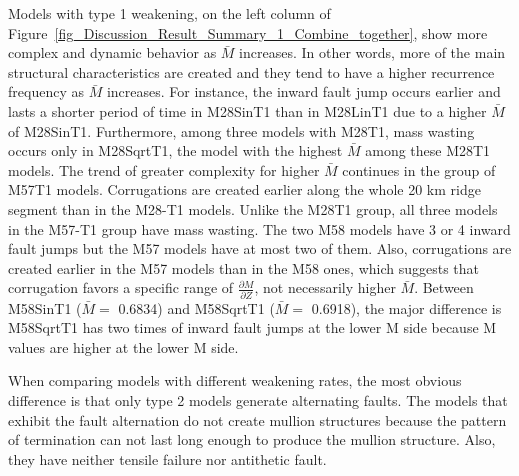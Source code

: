 Models with type 1 weakening, on the left column of Figure~\hyperref[fig_Discussion_Result_Summary_1_Combine_together]{\ref{fig_Discussion_Result_Summary_1_Combine_together}}, show more complex and dynamic behavior as $\bar{M}$ increases. In other words, more of the main structural characteristics are created and they tend to have a higher recurrence frequency as $\bar{M}$ increases. %
%
For instance, %
the inward fault jump occurs earlier and lasts a shorter period of time in M28SinT1 than in M28LinT1 due to a higher $\bar{M}$ of M28SinT1. Furthermore, among three models with M28T1, mass wasting occurs only in M28SqrtT1, the model with the highest $\bar{M}$ among these M28T1 models. 
The trend of greater complexity for higher $\bar{M}$ continues in the group of M57T1 models. Corrugations are created earlier along the whole 20 km ridge segment than in the M28-T1 models. Unlike the M28T1 group, all three models in the M57-T1 group have mass wasting. %
The two M58 models have 3 or 4 inward fault jumps but the M57 models have at most two of them. Also, corrugations are created earlier in the M57 models than in the M58 ones, which suggests that corrugation favors a specific range of $\frac{\partial M}{\partial Z}$, not necessarily higher $\bar{M}$. Between M58SinT1 ($\bar{M} =$ 0.6834) and M58SqrtT1 ($\bar{M} =$ 0.6918), the major difference is M58SqrtT1 has two times of inward fault jumps at the lower M side because M values are higher at the lower M side.

When comparing models with different weakening rates, the most obvious difference is that only type 2 models generate alternating faults. The models that exhibit the fault alternation do not create mullion structures because the pattern of termination can not last long enough to produce the mullion structure. Also, they have neither tensile failure nor antithetic fault.

